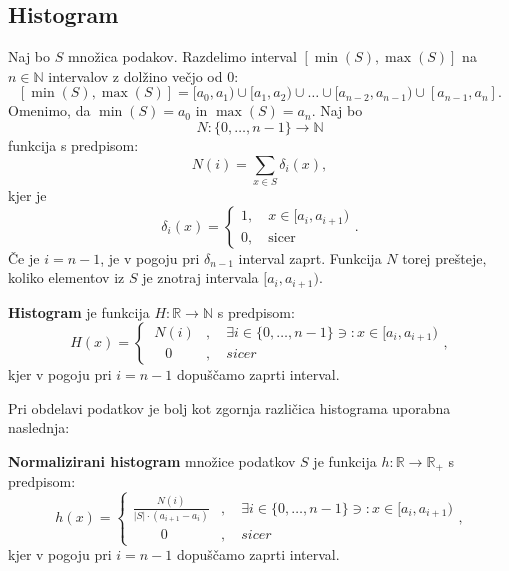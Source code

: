 \subsection{Histogram}\label{pog-histogram}

Naj bo $S$ množica podakov. Razdelimo interval $[\min(S), \max(S)]$ na $n \in \mathbb{N}$ intervalov z dolžino večjo od 0:
\[
[\min(S), \max(S)] = [a_0, a_1) \cup [a_1, a_2) \cup \ldots \cup [a_{n-2}, a_{n-1}) \cup [a_{n-1}, a_n].
\]
Omenimo, da $\min(S) = a_0$ in $\max(S) = a_n$. Naj bo
\[
    N: \{ 0, \ldots, n-1 \} \rightarrow \mathbb{N}
\]
funkcija s predpisom:
\[
N(i) = \sum_{x \in S} \delta_i(x),
\]
kjer je
\[
    \delta_i(x) =
    \begin{cases}
        1, \quad x \in [a_i, a_{i+1}) \\
        0, \quad \text{sicer}
    \end{cases}.    
\]
Če je $i = n - 1$, je v pogoju pri $\delta_{n-1}$ interval zaprt. Funkcija $N$ torej prešteje, koliko elementov iz $S$ je znotraj intervala $[a_i, a_{i+1})$.
\pagebreak
\begin{definicija}
    \textbf{Histogram} je funkcija $H: \mathbb{R} \rightarrow \mathbb{N}$ s predpisom:
    \begin{equation}
        H(x) =
        \begin{cases}
            \ N(i)&, \quad \exists i \in \{ 0, \ldots, n-1\} \ni: x \in [a_i, a_{i+1}) \\
            \quad 0&, \quad sicer 
        \end{cases},
    \end{equation}
    kjer v pogoju pri $i=n-1$ dopuščamo zaprti interval.
\end{definicija}

Pri obdelavi podatkov je bolj kot zgornja različica histograma uporabna naslednja:

\begin{definicija}
    \textbf{Normalizirani histogram} množice podatkov $S$ je funkcija $h: \mathbb{R} \rightarrow \mathbb{R}_+$ s predpisom:
    \begin{equation}
        h(x) =
        \begin{cases}
            \frac{N(i)}{|S|\cdot (a_{i+1} - a_i)}&, \quad \exists i \in \{ 0, \ldots, n-1\} \ni: x \in [a_i, a_{i+1}) \\
            \quad\quad 0&, \quad sicer 
        \end{cases},
    \end{equation}
    kjer v pogoju pri $i=n-1$ dopuščamo zaprti interval.
\end{definicija}


